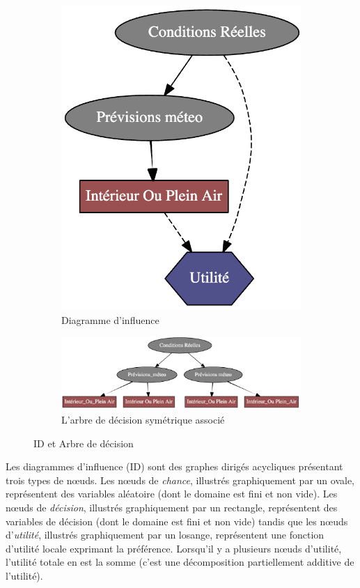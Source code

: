 \documentclass[12pt]{article}
\begin{document}
\begin{figure}[ht]
\centering
\begin{subfigure}{.5\textwidth}
  \centering
  \includegraphics[width=.5\linewidth]{docs/ressources_rapport/exempleID_SIMPLE.png}
  \caption{Diagramme d'influence}
  \label{fig:sub1}
\end{subfigure}%
\begin{subfigure}{.5\textwidth}
  \centering
  \includegraphics[width=1.2\linewidth]{docs/ressources_rapport/exempleArbreDecision.png}
  \caption{L'arbre de décision symétrique associé}
  \label{fig:sub2}
\end{subfigure}
\caption{ID et Arbre de décision}
\label{fig:test}
\end{figure}

Les diagrammes d'influence (ID) sont des graphes dirigés acycliques présentant trois types de nœuds. Les nœuds de \textit{chance}, illustrés graphiquement par un ovale, représentent des variables aléatoire (dont le domaine est fini et non vide). 
Les nœuds de \textit{décision}, illustrés graphiquement par un rectangle, représentent des variables de décision (dont le domaine est fini et non vide) tandis que les nœuds d'\textit{utilité}, illustrés graphiquement par un losange, représentent une fonction d'utilité locale exprimant la préférence.
Lorsqu'il y a plusieurs nœuds d'utilité, l'utilité totale en est la somme (c'est une décomposition partiellement additive de l'utilité).
\end{document}
